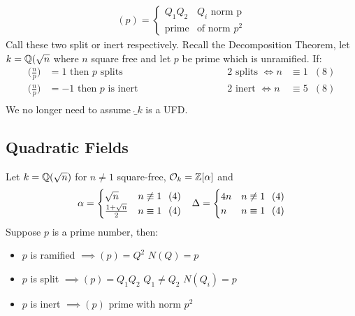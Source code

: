 \documentclass[11pt]{article}
\begin{document}
\begin{align*}
	(p) = \begin{cases}
		Q_1 Q_2 & Q_i \text{ norm p}\\
		\text{prime} & \text{of norm } p^2
	\end{cases}
\end{align*}
Call these two split or inert respectively.
\spac
Recall the Decomposition Theorem, let $k = \mathbb{Q}(\sqrt{n}$ where $n$ square free and let $p$ be prime which is unramified.
If:
\begin{align*}
	\Big(\frac{n}{p}\Big)  &= 1 \text{ then $p$ splits}  \hspace{100pt}& 2 \text{ splits } \iff n &\equiv 1 \hspace{7pt} (8)\\
	\Big(\frac{n}{p}\Big)  &= -1 \text{ then $p$ is inert}  \hspace{100pt}& 2 \text{ inert } \iff n &\equiv 5 \hspace{7pt} (8)\\
\end{align*}
We no longer need to assume $\ring_k$ is a UFD.

\subsection{Quadratic Fields}
Let $k = \mathbb{Q}(\sqrt{n})$ for $n \neq 1$ square-free, $\mathcal{O}_k = \mathbb{Z}[\alpha] $ and 
\begin{align*}
	\alpha =
	\begin{cases}
		\sqrt{n} & n \not \equiv 1 \hspace{7pt} (4) \\
		\frac{1+\sqrt{n}}2 &  n\equiv 1 \hspace{7pt} (4)
	\end{cases}
	&&\Delta = \begin{cases}
	4n & n \not \equiv 1 \hspace{7pt} (4)\\
	n & n \equiv 1 \hspace{7pt} (4) 
\end{cases} 
\end{align*}
Suppose $p$ is a prime number, then:

\begin{itemize}
	\item{$p$ is ramified $\implies (p) = Q^2$ \hspace{25pt}  $N(Q)=p$}
	\item{$p$ is split $\implies (p) = Q_1Q_2$  \hspace{25pt} $Q_1 \neq Q_2$ $N(Q_i) = p$}
	\item{$p$ is inert $\implies (p)$ prime with norm $p^2$}
\end{itemize}
 
\end{document}
